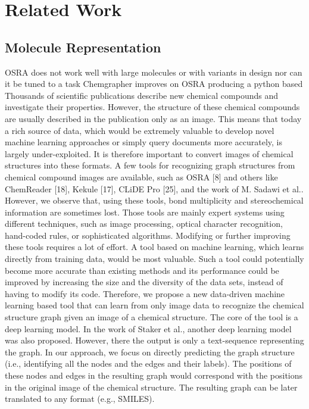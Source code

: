 \section{Related Work}
\subsection{Molecule Representation}
OSRA does not work well with large molecules or with variants in design nor can it be tuned to a task
Chemgrapher \cite{Oldenhof2020ChemGrapherOG} improves on OSRA producing a python based 
Thousands of scientific publications describe new chemical compounds and investigate their
properties. However, the structure of these chemical compounds are usually described in the
publication only as an image. This means that today a rich source of data, which would be
extremely valuable to develop novel machine learning approaches or simply query documents
more accurately, is largely under-exploited. It is therefore important to convert images of
chemical structures into these formats. A few tools for recognizing graph structures from
chemical compound images are available, such as OSRA [8] and others like ChemReader [18],
Kekule [17], CLiDE Pro [25], and the work of M. Sadawi et al.. However, we observe that,
using these tools, bond multiplicity and stereochemical information are sometimes lost. Those
tools are mainly expert systems using different techniques, such as image processing, optical
character recognition, hand-coded rules, or sophisticated algorithms. Modifying or further
improving these tools requires a lot of effort. A tool based on machine learning, which learns
directly from training data, would be most valuable. Such a tool could potentially become
more accurate than existing methods and its performance could be improved by increasing
the size and the diversity of the data sets, instead of having to modify its code.
Therefore, we propose a new data-driven machine learning based tool that can learn from
only image data to recognize the chemical structure graph given an image of a chemical
structure. The core of the tool is a deep learning model. In the work of Staker et al., another
deep learning model was also proposed. However, there the output is only a text-sequence
representing the graph. In our approach, we focus on directly predicting the graph structure
(i.e., identifying all the nodes and the edges and their labels). The positions of these nodes
and edges in the resulting graph would correspond with the positions in the original image
of the chemical structure. The resulting graph can be later translated to any format (e.g.,
SMILES).

